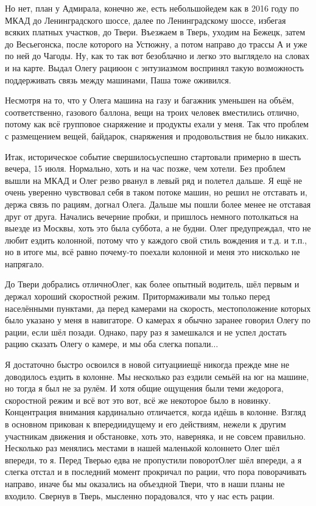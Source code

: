 Но нет, план у Адмирала, конечно же, есть небольшой\mdash едем как в 2016 году по МКАД до Ленинградского шоссе, далее по Ленинградскому шоссе, избегая всяких платных участков, до Твери. Въезжаем в Тверь, уходим на Бежецк, затем до Весьегонска, после которого на Устюжну, а потом направо до трассы А и уже по ней до Чагоды. Ну, как то так вот безоблачно и легко это выглядело на словах и на карте. Выдал Олегу рацию\mdash он с энтузиазмом воспринял такую возможность поддерживать связь между машинами, Паша тоже оживился. 

Несмотря на то, что у Олега машина на газу и багажник уменьшен на объём, соответственно, газового баллона, вещи на троих человек вместились отлично, потому как всё групповое снаряжение и продукты ехали у меня. Так что проблем с размещением вещей, байдарок, снаряжения и продовольствия не было никаких.

Итак, историческое событие свершилось\mdash успешно стартовали примерно в шесть вечера, 15 июля. Нормально, хоть и на час позже, чем хотели. Без проблем вышли на МКАД и Олег резво рванул в левый ряд и полетел дальше. Я ещё не очень уверенно чувствовал себя в таком потоке машин, но решил не отставать и, держа связь по рациям, догнал Олега. Дальше мы пошли более менее не отставая друг от друга. Начались вечерние пробки, и пришлось немного потолкаться на выезде из Москвы, хоть это была суббота, а не будни. Олег предупреждал, что не любит ездить колонной, потому что у каждого свой стиль вождения и т.д. и т.п., но в итоге мы, всё равно почему-то поехали колонной и меня это нисколько не напрягало.

До Твери добрались отлично\mdash Олег, как более опытный водитель, шёл первым и держал хороший скоростной режим. Притормаживали мы только перед населёнными пунктами, да перед камерами на скорость, местоположение которых было указано у меня в навигаторе. О камерах я обычно заранее говорил Олегу по рации, если шёл позади. Однако, пару раз я замешкался и не успел достать рацию сказать Олегу о камере, и мы оба слегка попали$\ldots$

Я достаточно быстро освоился в новой ситуации\mdash ещё никогда прежде мне не доводилось ездить в колонне. Мы несколько раз ездили семьёй на юг на машине, но тогда я был не за рулём. И хотя общие ощущения были теми же\mdash дорога, скоростной режим и всё вот это вот, всё же некоторое было в новинку. Концентрация внимания кардинально отличается, когда идёшь в колонне. Взгляд в основном прикован к впередиидущему и его действиям, нежели к другим участникам движения и обстановке, хоть это, наверняка, и не совсем правильно. Несколько раз менялись местами в нашей маленькой колонне\mdash то Олег шёл впереди, то я. Перед Тверью едва не пропустили поворот\mdash Олег шёл впереди, а я слегка отстал и в последний момент прокричал по рации, что пора поворачивать направо, иначе бы мы оказались на объездной Твери, что в наши планы не входило. Свернув в Тверь, мысленно порадовался, что у нас есть рации.

